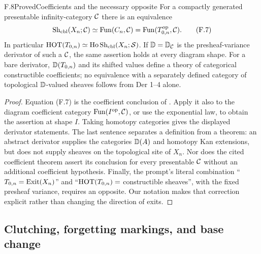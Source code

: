 \begin{statement}{F.8}{Proved}{Coefficients and the necessary opposite}
For a compactly generated presentable infinity-category $\mathcal C$ there
is an equivalence
\[
 \operatorname{Sh}_{\rm cbl}(X_n;\mathcal C)\simeq
 \operatorname{Fun}(C_n,\mathcal C)=\operatorname{Fun}(T_{0,n}^{\mathrm{op}},\mathcal C).              \tag{F.7}
\]
In particular $\mathrm{HOT}(T_{0,n})\simeq\operatorname{Ho}\operatorname{Sh}_{\rm cbl}(X_n;\mathcal S)$.
If $\mathbb D=\mathbb D_{\mathcal C}$ is the presheaf-variance derivator of such a
$\mathcal C$, the same assertion holds at every diagram shape.  For a bare
derivator, $\mathbb D(T_{0,n})$ and its shifted values define a theory of
categorical constructible coefficients; no equivalence with a separately
defined category of topological $\mathbb D$-valued sheaves follows from Der
1--4 alone.
\end{statement}
\begin{proof}
Equation (F.7) is the coefficient conclusion of
\citet[Theorem 6.7]{FJansen2023}.  Apply it also to the diagram
coefficient category $\operatorname{Fun}(I^{\mathrm{op}},\mathcal C)$, or use the exponential law,
to obtain the assertion at shape $I$.  Taking homotopy categories gives
the displayed derivator statements.  The last sentence separates a
definition from a theorem: an abstract derivator supplies the categories
$\mathbb D(A)$ and homotopy Kan extensions, but does not supply sheaves on the
topological site of $X_n$.  Nor does the cited coefficient theorem
assert its conclusion for every presentable $\mathcal C$ without an additional
coefficient hypothesis.  Finally, the prompt's literal combination
``$T_{0,n}=\operatorname{Exit}(X_n)$'' and
``$\mathrm{HOT}(T_{0,n})=$ constructible sheaves'', with the fixed presheaf
variance, requires an opposite.  Our notation makes that correction
explicit rather than changing the direction of exits.
\end{proof}

\subsection{Clutching, forgetting markings, and base change}

